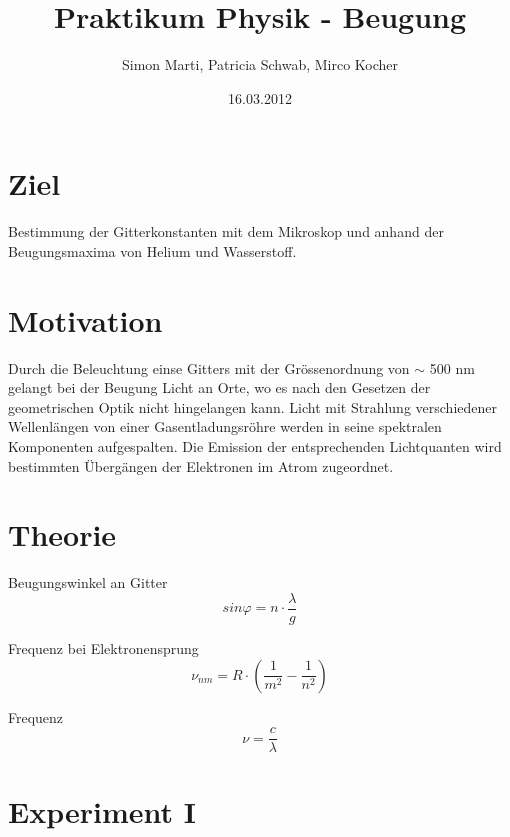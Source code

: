 \documentclass[12pt,a4paper]{article}
\title{Praktikum Physik - Beugung}
\author{Simon Marti, Patricia Schwab, Mirco Kocher}
\date{16.03.2012}
\begin{document}
\maketitle

\section*{Ziel}
Bestimmung der Gitterkonstanten mit dem Mikroskop und anhand der Beugungsmaxima von Helium und Wasserstoff.

\section*{Motivation}
Durch die Beleuchtung einse Gitters mit der Gr\"ossenordnung von $\sim$ 500 nm gelangt bei der Beugung Licht an Orte, wo es nach den Gesetzen der geometrischen Optik nicht hingelangen kann. Licht mit Strahlung verschiedener Wellenl\"angen von einer Gasentladungsr\"ohre werden in seine spektralen Komponenten aufgespalten. Die Emission der entsprechenden Lichtquanten wird bestimmten \"Uberg\"angen der Elektronen im Atrom zugeordnet.


\section*{Theorie}
Beugungswinkel an Gitter
\begin{equation}\label{eq:g}
sin\varphi = n\cdot \frac{\lambda}{g}
\end{equation}

Frequenz bei Elektronensprung
\begin{equation}
\nu_{nm} = R\cdot \left(\frac{1}{m^2}-\frac{1}{n^2}\right)
\end{equation}

Frequenz
\begin{equation}
\nu = \frac{c}{\lambda}
\end{equation}

\section*{Experiment I}

\end{document}
